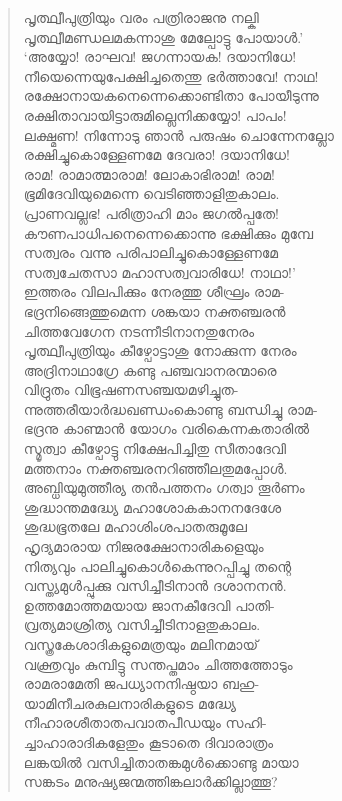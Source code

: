 \begin{verse}
പൃത്ഥ്വീപുത്രിയും വരം പത്രിരാജനു നല്കി\\
പൃത്ഥ്വീമണ്ഡലമകന്നാശു മേല്പോട്ടു പോയാള്‍.’\\
‘അയ്യോ! രാഘവ! ജഗന്നായക! ദയാനിധേ!\\
നീയെന്നെയുപേക്ഷിച്ചതെന്തു ഭര്‍ത്താവേ! നാഥ!\\
രക്ഷോനായകനെന്നെക്കൊണ്ടിതാ പോയീടുന്നു\\
രക്ഷിതാവായിട്ടാരുമില്ലെനിക്കയ്യോ! പാപം!\\
ലക്ഷ്മണ! നിന്നോടു ഞാന്‍ പരുഷം ചൊന്നേനല്ലോ\\
രക്ഷിച്ചുകൊള്ളേണമേ ദേവരാ! ദയാനിധേ!\\
രാമ! രാമാത്മാരാമ! ലോകാഭിരാമ! രാമ!\\
ഭൂമിദേവിയുമെന്നെ വെടിഞ്ഞാളിതുകാലം.\\
പ്രാണവല്ലഭ! പരിത്രാഹി മാം ജഗല്‍പ്പതേ!\\
കൗണപാധിപനെന്നെക്കൊന്നു ഭക്ഷിക്കും മുമ്പേ\\
സത്വരം വന്നു പരിപാലിച്ചുകൊള്ളേണമേ\\
സത്വചേതസാ മഹാസത്വവാരിധേ! നാഥാ!’\\
ഇത്തരം വിലപിക്കും നേരത്തു ശീഘ്രം രാമ-\\
ഭദ്രനിങ്ങെത്തുമെന്ന ശങ്കയാ നക്തഞ്ചരന്‍\\
ചിത്തവേഗേന നടന്നീടിനാനതുനേരം\\
പൃത്ഥ്വീപുത്രിയും കീഴ്പോട്ടാശു നോക്കുന്ന നേരം\\
അദ്രിനാഥാഗ്രേ കണ്ടു പഞ്ചവാനരന്മാരെ\\
വിദ്രുതം വിഭൂഷണസഞ്ചയമഴിച്ചുത-\\
ന്നുത്തരീയാര്‍ദ്ധഖണ്ഡംകൊണ്ടു ബന്ധിച്ചു രാമ-\\
ഭദ്രനു കാണ്മാന്‍ യോഗം വരികെന്നകതാരില്‍\\
സ്മൃത്വാ കീഴ്പോട്ടു നിക്ഷേപിച്ചിതു സീതാദേവി\\
മത്തനാം നക്തഞ്ചരനറിഞ്ഞീലതുമപ്പോള്‍.\\
അബ്ധിയുമുത്തീര്യ തന്‍പത്തനം ഗത്വാ തൂര്‍ണം\\
ശുദ്ധാന്തമദ്ധ്യേ മഹാശോകകാനനദേശേ\\
ശുദ്ധഭൂതലേ മഹാശിംശപാതരുമൂലേ\\
ഹൃദ്യമാരായ നിജരക്ഷോനാരികളെയും\\
നിത്യവും പാലിച്ചുകൊള്‍കെന്നുറപ്പിച്ചു തന്റെ\\
വസ്ത്യമുള്‍പ്പുക്കു വസിച്ചീടിനാന്‍ ദശാനനന്‍.\\
ഉത്തമോത്തമയായ ജാനകീദേവി പാതി-\\
വ്രത്യമാശ്രിത്യ വസിച്ചീടിനാളതുകാലം.\\
വസ്ത്രകേശാദികളുമെത്രയും മലിനമായ്\\
വക്ത്രവും കുമ്പിട്ടു സന്തപ്തമാം ചിത്തത്തോടും\\
രാമരാമേതി ജപധ്യാനനിഷ്ഠയാ ബഹു-\\
യാമിനീചരകുലനാരികളുടെ മദ്ധ്യേ\\
നീഹാരശീതാതപവാതപീഡയും സഹി-\\
ച്ചാഹാരാദികളേതും കൂടാതെ ദിവാരാത്രം\\
ലങ്കയില്‍ വസിച്ചിതാതങ്കമുള്‍ക്കൊണ്ടു മായാ\\
സങ്കടം മനുഷ്യജന്മത്തിങ്കലാര്‍ക്കില്ലാത്തൂ?
\end{verse}

